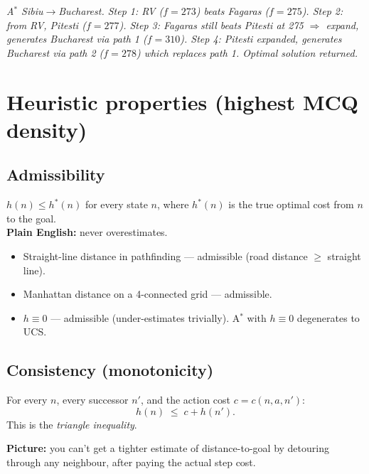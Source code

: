 \documentclass[11pt, a4paper]{article}
\begin{document}
\begin{center}

\footnotesize\textit{A$^{*}$ Sibiu$\to$Bucharest. Step 1: RV ($f=273$) beats Fagaras ($f=275$). Step 2: from RV, Pitesti ($f=277$). Step 3: Fagaras still beats Pitesti at 275 $\Rightarrow$ expand, generates Bucharest via path 1 ($f=310$). Step 4: Pitesti expanded, generates Bucharest via path 2 ($f=278$) which replaces path 1. Optimal solution returned.}
\end{center}

\section{Heuristic properties (highest MCQ density)}

\subsection{Admissibility}

\begin{defbox}
$h(n) \le h^*(n)$ for every state $n$, where $h^*(n)$ is the true optimal cost from $n$ to the goal. \\
\textbf{Plain English:} never overestimates.
\end{defbox}

\begin{itemize}
  \item Straight-line distance in pathfinding --- admissible (road distance $\ge$ straight line).
  \item Manhattan distance on a 4-connected grid --- admissible.
  \item $h \equiv 0$ --- admissible (under-estimates trivially). A$^{*}$ with $h\equiv 0$ degenerates to UCS.
\end{itemize}

\subsection{Consistency (monotonicity)}

\begin{defbox}
For every $n$, every successor $n'$, and the action cost $c = c(n,a,n')$:
\[ h(n) \;\le\; c + h(n'). \]
This is the \emph{triangle inequality}.
\end{defbox}

\textbf{Picture:} you can't get a tighter estimate of distance-to-goal by detouring through any neighbour, after paying the actual step cost.
\end{document}
